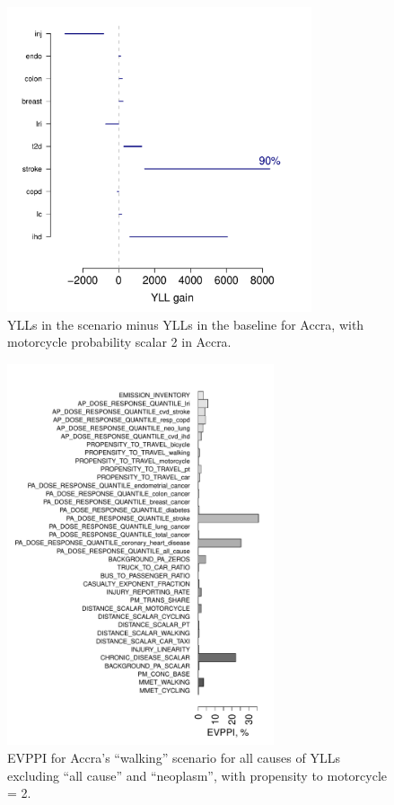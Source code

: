 \documentclass{article}
\begin{document}
\begin{appendix}
\begin{figure}[h]
\includegraphics[width=0.8\textwidth]{accra_walk_yll_uncertain_travel.pdf}
\caption{\small YLLs in the scenario minus YLLs in the baseline for Accra, with motorcycle probability scalar 2 in Accra.}
\label{results}
\end{figure}

\begin{figure}[h]
\includegraphics[width=0.7\textwidth]{accra_walk_evppi_uncertain_travel.pdf}
\caption{\small EVPPI for Accra's ``walking'' scenario for all causes of YLLs excluding ``all cause'' and ``neoplasm'', with propensity to motorcycle = 2.}
\label{evppi_mode_propensities_200}
\end{figure}


\end{appendix}
\end{document}
